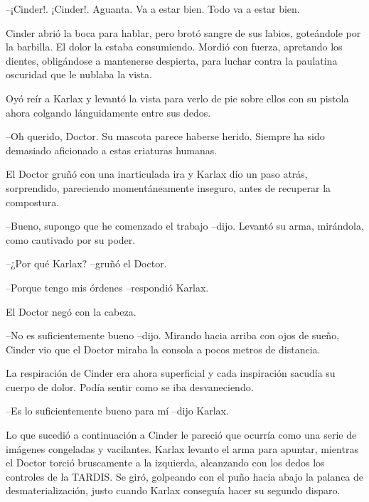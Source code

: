 --¡Cinder!. ¡Cinder!. Aguanta. Va a estar bien. Todo va a estar bien.



Cinder abrió la boca para hablar, pero brotó sangre de sus labios, goteándole por la barbilla. El dolor la estaba consumiendo. Mordió con fuerza, apretando los dientes, obligándose a mantenerse despierta, para luchar contra la paulatina oscuridad que le nublaba la vista.



Oyó reír a Karlax y levantó la vista para verlo de pie sobre ellos con su pistola ahora colgando lánguidamente entre sus dedos. 



--Oh querido, Doctor. Su mascota parece haberse herido. Siempre ha sido demasiado aficionado a estas criaturas humanas.



El Doctor gruñó con una inarticulada ira y Karlax dio un paso atrás, sorprendido, pareciendo momentáneamente inseguro, antes de recuperar la compostura. 



--Bueno, supongo que he comenzado el trabajo --dijo. Levantó su arma, mirándola, como cautivado por su poder.



--¿Por qué Karlax? --gruñó el Doctor.



--Porque tengo mis órdenes --respondió Karlax.



El Doctor negó con la cabeza. 



--No es suficientemente bueno --dijo. Mirando hacia arriba con ojos de sueño, Cinder vio que el Doctor miraba la consola a pocos metros de distancia.



La respiración de Cinder era ahora superficial y cada inspiración sacudía su cuerpo de dolor. Podía sentir como se iba desvaneciendo.



--Es lo suficientemente bueno para mí --dijo Karlax.



Lo que sucedió a continuación a Cinder le pareció que ocurría como una serie de imágenes congeladas y vacilantes. Karlax levanto el arma para apuntar, mientras el Doctor torció bruscamente a la izquierda, alcanzando con los dedos los controles de la TARDIS. Se giró, golpeando con el puño hacia abajo la palanca de desmaterialización, justo cuando Karlax conseguía  hacer su segundo disparo.



